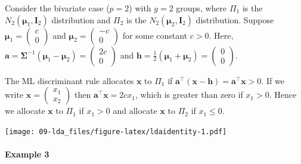 \documentclass[
]{book}
\theoremstyle{definition}
\theoremstyle{definition}
\theoremstyle{definition}
\theoremstyle{definition}
\theoremstyle{remark}
\begin{document}
Consider the bivariate case (\(p=2\)) with \(g=2\) groups, where \(\Pi_1\) is the \(N_2({\boldsymbol{\mu}}_1,\mathbf I_2)\) distribution and \(\Pi_2\) is the \(N_2({\boldsymbol{\mu}}_2,\mathbf I_2)\) distribution. Suppose \({\boldsymbol{\mu}}_1 = \begin{pmatrix} c \\ 0 \end{pmatrix}\) and \({\boldsymbol{\mu}}_2 = \begin{pmatrix} -c \\ 0 \end{pmatrix}\) for some constant \(c>0\). Here, \(\mathbf a= \boldsymbol{\Sigma}^{-1} ({\boldsymbol{\mu}}_1 - {\boldsymbol{\mu}}_2) = \begin{pmatrix} 2c \\ 0 \end{pmatrix}\) and \(\mathbf h= \frac{1}{2}( {\boldsymbol{\mu}}_1 + {\boldsymbol{\mu}}_2 ) = \begin{pmatrix} 0 \\ 0 \end{pmatrix}\).

The ML discriminant rule allocates \(\mathbf x\) to \(\Pi_1\) if \(\mathbf a^\top (\mathbf x- \mathbf h) = \mathbf a^\top \mathbf x> 0\). If we write \(\mathbf x= \begin{pmatrix} x_1 \\ x_2 \end{pmatrix}\) then \(\mathbf a^\top \mathbf x= 2cx_1\), which is greater than zero if \(x_1 > 0\). Hence we allocate \(\mathbf x\) to \(\Pi_1\) if \(x_1 > 0\) and allocate \(\mathbf x\) to \(\Pi_2\) if \(x_1 \leq 0\).

\texttt{[image: 09-lda\_files/figure-latex/ldaidentity-1.pdf]}

\hypertarget{example-3-1}{%
\paragraph*{Example 3}\label{example-3-1}}
\end{document}
